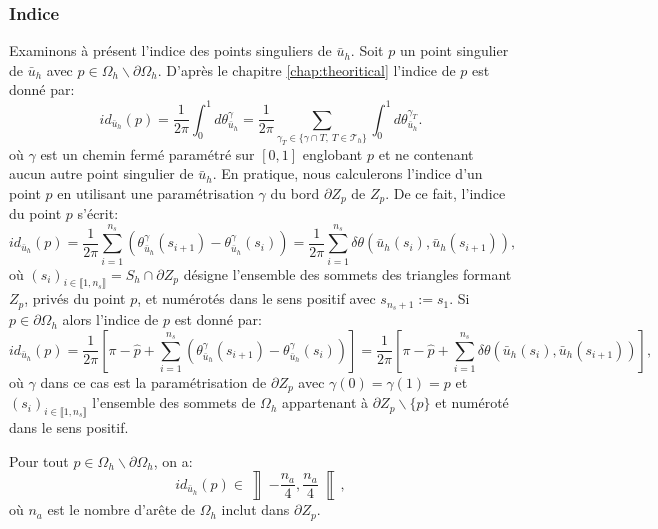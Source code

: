 \subsubsection*{Indice}
Examinons à présent l'indice des points singuliers de $\bar{u}_h$. Soit $p$ un point singulier de $\bar{u}_h$ avec $p\in\Omega_h\backslash\partial\Omega_h$. D'après le chapitre \ref{chap:theoritical} l'indice de $p$ est donné par:
$$
id_{\bar{u}_h}(p)=\frac{1}{2\pi}\int_0^1 d\theta^\gamma_{\bar{u}_h}=\frac{1}{2\pi}\sum_{\gamma_T\in\{\gamma\cap T,~T\in\mathcal{T}_h\}}\int_0^1 d\theta^{\gamma_T}_{\bar{u}_h}.
$$
où $\gamma$ est un chemin fermé paramétré sur $[0, 1]$ englobant $p$ et ne contenant aucun autre point singulier de $\bar{u}_h$. En pratique, nous calculerons l'indice d'un point $p$ en utilisant une paramétrisation $\gamma$ du bord $\partial Z_p$ de $Z_p$. De ce fait, l'indice du point $p$ s'écrit:
\begin{equation}
    \label{eqn:ind_int}
    id_{\bar{u}_h}(p)=\displaystyle\frac{1}{2\pi}\displaystyle\sum_{i=1}^{n_s}\left(\theta^\gamma_{\bar{u}_h}(s_{i+1})-\theta^\gamma_{\bar{u}_h}(s_i)\right)=\displaystyle\frac{1}{2\pi}\sum_{i=1}^{n_s}\delta\theta(\bar{u}_h(s_i),\bar{u}_h(s_{i+1})),
\end{equation}
où $(s_i)_{i\in\llbracket 1, n_s\rrbracket}=S_h\cap\partial Z_p$ désigne l'ensemble des sommets des triangles formant $Z_p$, privés du point $p$, et numérotés dans le sens positif avec $s_{n_s+1}:=s_1$.
Si $p\in\partial\Omega_h$ alors l'indice de $p$ est donné par:
\begin{equation}
    \label{eqn:ind_bord}
    id_{\bar{u}_h}(p)=\displaystyle\frac{1}{2\pi}\left[\pi-\widehat{p}+\displaystyle\sum_{i=1}^{n_s}\left(\theta^\gamma_{\bar{u}_h}(s_{i+1})-\theta^\gamma_{\bar{u}_h}(s_i)\right)\right]=\displaystyle\frac{1}{2\pi}\left[\pi-\widehat{p}+\displaystyle\sum_{i=1}^{n_s}\delta\theta(\bar{u}_h(s_i),\bar{u}_h(s_{i+1}))\right],
\end{equation}
où $\gamma$ dans ce cas est la paramétrisation de $\partial Z_p$ avec $\gamma(0)=\gamma(1)=p$ et $(s_i)_{i\in\llbracket 1, n_s\rrbracket}$ l'ensemble des sommets de $\Omega_h$ appartenant à $\partial Z_p\backslash\{p\}$ et numéroté dans le sens positif.

\begin{proposition}
\label{prop:ind_sing_zone}
Pour tout $p\in\Omega_h\backslash\partial\Omega_h$, on a:
$$
id_{\bar{u}_h}(p)\in\left\rrbracket-\frac{n_a}{4}, \frac{n_a}{4}\right\llbracket,
$$
où $n_a$ est le nombre d'arête de $\Omega_h$ inclut dans $\partial Z_p$.
\end{proposition}

